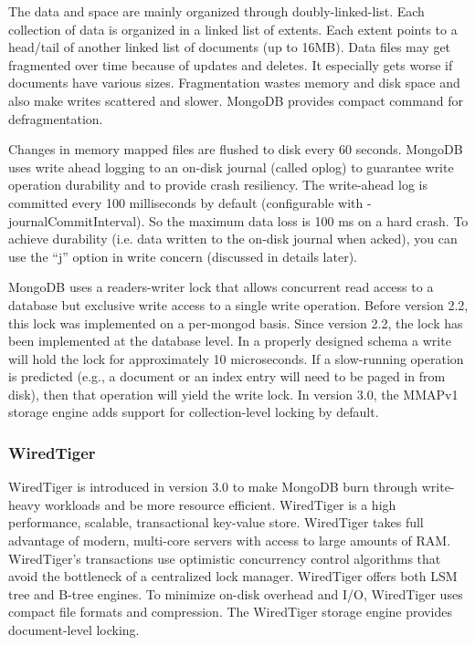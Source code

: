 \documentclass[12pt]{book}
\begin{document}
The data and space are mainly organized through doubly-linked-list. Each collection of data is organized in a linked list of extents. Each extent points to a head/tail of another linked list of documents (up to 16MB). Data files may get fragmented over time because of updates and deletes. It especially gets worse if documents have various sizes. Fragmentation wastes memory and disk space and also make writes scattered and slower. MongoDB provides compact command for defragmentation.

Changes in memory mapped files are flushed to disk every 60 seconds. MongoDB uses write ahead logging to an on-disk journal (called oplog) to guarantee write operation durability and to provide crash resiliency. The write-ahead log is committed every 100 milliseconds by default (configurable with -journalCommitInterval). So the maximum data loss is 100 ms on a hard crash. To achieve durability (i.e. data written to the on-disk journal when acked), you can use the ``j'' option in write concern (discussed in details later).

MongoDB uses a readers-writer lock that allows concurrent read access to a database but exclusive write access to a single write operation. Before version 2.2, this lock was implemented on a per-mongod basis. Since version 2.2, the lock has been implemented at the database level. In a properly designed schema a write will hold the lock for approximately 10 microseconds. If a slow-running operation is predicted (e.g., a document or an index entry will need to be paged in from disk), then that operation will yield the write lock. In version 3.0, the MMAPv1 storage engine adds support for collection-level locking by default.

\subsubsection{WiredTiger}
WiredTiger \cite{WiredTiger} is introduced in version 3.0 to make MongoDB burn through write-heavy workloads and be more resource efficient.
WiredTiger is a high performance, scalable, transactional key-value store. WiredTiger takes full advantage of modern, multi-core servers with access to large amounts of RAM. WiredTiger's transactions use optimistic concurrency control algorithms that avoid the bottleneck of a centralized lock manager. WiredTiger offers both LSM tree and B-tree engines. To minimize on-disk overhead and I/O, WiredTiger uses compact file formats and compression.
The WiredTiger storage engine provides document-level locking.
\end{document}
